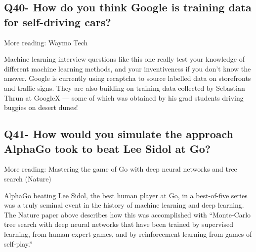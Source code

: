 \documentclass[11pt,a4paper]{article}
\begin{document}
\subsection{Q40- How do you think Google is training data for self-driving cars?}

More reading: Waymo Tech

Machine learning interview questions like this one really test your knowledge of different machine learning methods, and your inventiveness if you don’t know the answer. Google is currently using recaptcha to source labelled data on storefronts and traffic signs. They are also building on training data collected by Sebastian Thrun at GoogleX — some of which was obtained by his grad students driving buggies on desert dunes!

\subsection{Q41- How would you simulate the approach AlphaGo took to beat Lee Sidol at Go?}

More reading: Mastering the game of Go with deep neural networks and tree search (Nature)

AlphaGo beating Lee Sidol, the best human player at Go, in a best-of-five series was a truly seminal event in the history of machine learning and deep learning. The Nature paper above describes how this was accomplished with “Monte-Carlo tree search with deep neural networks that have been trained by supervised learning, from human expert games, and by reinforcement learning from games of self-play.”
\end{document}
